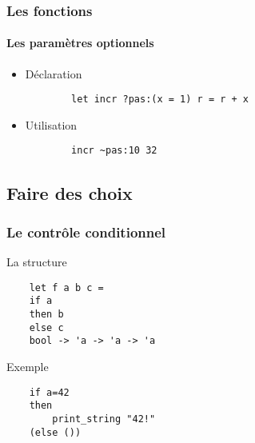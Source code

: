 \begin{frame}[fragile]
	\frametitle{Les fonctions}
	\framesubtitle{Les paramètres optionnels}
	\begin{itemize}	

	\item 	\begin{block}{Déclaration}
		\begin{lstlisting}
		let incr ?pas:(x = 1) r = r + x
		\end{lstlisting}
		\end{block}

	\item 	\begin{block}{Utilisation}
		\begin{lstlisting}
		incr ~pas:10 32
		\end{lstlisting}
		\end{block}

\end{itemize}
\end{frame}

\subsection{Faire des choix} %
\begin{frame}[fragile]
	\frametitle{Le contrôle conditionnel}
	\begin{block}{La structure}
	\begin{lstlisting}
	let f a b c = 
	if a
	then b 
	else c
	bool -> 'a -> 'a -> 'a
	\end{lstlisting}
	\end{block}
	\begin{block}{Exemple}
	\begin{lstlisting}
	if a=42
  	then 
    	print_string "42!" 
  	(else ())
	\end{lstlisting}
	\end{block}
\end{frame}


